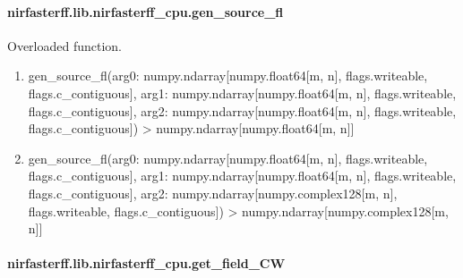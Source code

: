 \documentclass[letterpaper,10pt,english]{sphinxmanual}
\begin{document}
\sphinxstepscope


\paragraph{nirfasterff.lib.nirfasterff\_cpu.gen\_source\_fl}
\label{\detokenize{_autosummary/nirfasterff.lib.nirfasterff_cpu.gen_source_fl:nirfasterff-lib-nirfasterff-cpu-gen-source-fl}}\label{\detokenize{_autosummary/nirfasterff.lib.nirfasterff_cpu.gen_source_fl::doc}}

\begin{fulllineitems}
\label{\detokenize{_autosummary/nirfasterff.lib.nirfasterff_cpu.gen_source_fl:nirfasterff.lib.nirfasterff_cpu.gen_source_fl}}
\pysigstartsignatures
\pysiglinewithargsret
{}
{\sphinxparamcomma {}}
{}
\pysigstopsignatures
\sphinxAtStartPar
Overloaded function.
\begin{enumerate}
%
\item {} 
\sphinxAtStartPar
gen\_source\_fl(arg0: numpy.ndarray{[}numpy.float64{[}m, n{]}, flags.writeable, flags.c\_contiguous{]}, arg1: numpy.ndarray{[}numpy.float64{[}m, n{]}, flags.writeable, flags.c\_contiguous{]}, arg2: numpy.ndarray{[}numpy.float64{[}m, n{]}, flags.writeable, flags.c\_contiguous{]}) \sphinxhyphen{}\textgreater{} numpy.ndarray{[}numpy.float64{[}m, n{]}{]}

\item {} 
\sphinxAtStartPar
gen\_source\_fl(arg0: numpy.ndarray{[}numpy.float64{[}m, n{]}, flags.writeable, flags.c\_contiguous{]}, arg1: numpy.ndarray{[}numpy.float64{[}m, n{]}, flags.writeable, flags.c\_contiguous{]}, arg2: numpy.ndarray{[}numpy.complex128{[}m, n{]}, flags.writeable, flags.c\_contiguous{]}) \sphinxhyphen{}\textgreater{} numpy.ndarray{[}numpy.complex128{[}m, n{]}{]}

\end{enumerate}

\end{fulllineitems}


\sphinxstepscope


\paragraph{nirfasterff.lib.nirfasterff\_cpu.get\_field\_CW}
\label{\detokenize{_autosummary/nirfasterff.lib.nirfasterff_cpu.get_field_CW:nirfasterff-lib-nirfasterff-cpu-get-field-cw}}\label{\detokenize{_autosummary/nirfasterff.lib.nirfasterff_cpu.get_field_CW::doc}}
\end{document}
